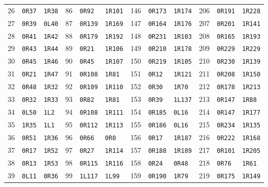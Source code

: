 \begin{tabular}{rll@{\hspace{12pt}}rll@{\hspace{12pt}}rll@{\hspace{12pt}}rll}
26 & \texttt{0R37} & \texttt{1R38} & 86 & \texttt{0R92} & \texttt{1R101} & 146 & \texttt{0R173} & \texttt{1R174} & 206 & \texttt{0R191} & \texttt{1R228}\\
27 & \texttt{0R39} & \texttt{0L40} & 87 & \texttt{0R139} & \texttt{1R169} & 147 & \texttt{0R164} & \texttt{1R176} & 207 & \texttt{0R201} & \texttt{1R141}\\
28 & \texttt{0R41} & \texttt{1R42} & 88 & \texttt{0R179} & \texttt{1R192} & 148 & \texttt{0R231} & \texttt{1R103} & 208 & \texttt{0R165} & \texttt{1R193}\\
29 & \texttt{0R43} & \texttt{1R44} & 89 & \texttt{0R21} & \texttt{1R106} & 149 & \texttt{0R210} & \texttt{1R178} & 209 & \texttt{0R229} & \texttt{1R229}\\
30 & \texttt{0R45} & \texttt{1R46} & 90 & \texttt{0R45} & \texttt{1R107} & 150 & \texttt{0R219} & \texttt{1R105} & 210 & \texttt{0R230} & \texttt{1R139}\\
31 & \texttt{0R21} & \texttt{1R47} & 91 & \texttt{0R108} & \texttt{1R81} & 151 & \texttt{0R12} & \texttt{1R121} & 211 & \texttt{0R208} & \texttt{1R150}\\
32 & \texttt{0R48} & \texttt{1R32} & 92 & \texttt{0R109} & \texttt{1R110} & 152 & \texttt{0R30} & \texttt{1R70} & 212 & \texttt{0R178} & \texttt{1R213}\\
33 & \texttt{0R32} & \texttt{1R33} & 93 & \texttt{0R82} & \texttt{1R81} & 153 & \texttt{0R39} & \texttt{1L137} & 213 & \texttt{0R147} & \texttt{1R88}\\
34 & \texttt{0L50} & \texttt{1L2} & 94 & \texttt{0R108} & \texttt{1R111} & 154 & \texttt{0R185} & \texttt{0L16} & 214 & \texttt{0R147} & \texttt{1R177}\\
35 & \texttt{1R35} & \texttt{1L1} & 95 & \texttt{0R112} & \texttt{1R113} & 155 & \texttt{0R186} & \texttt{0L16} & 215 & \texttt{0R234} & \texttt{1R135}\\
36 & \texttt{0R51} & \texttt{1R36} & 96 & \texttt{0R66} & \texttt{0R0} & 156 & \texttt{0R17} & \texttt{1R187} & 216 & \texttt{0R222} & \texttt{1R168}\\
37 & \texttt{0R17} & \texttt{1R52} & 97 & \texttt{0R27} & \texttt{1R114} & 157 & \texttt{0R188} & \texttt{1R189} & 217 & \texttt{0R101} & \texttt{1R205}\\
38 & \texttt{0R13} & \texttt{1R53} & 98 & \texttt{0R115} & \texttt{1R116} & 158 & \texttt{0R24} & \texttt{0R48} & 218 & \texttt{0R76} & \texttt{1R61}\\
39 & \texttt{0L11} & \texttt{0R36} & 99 & \texttt{1L117} & \texttt{1L99} & 159 & \texttt{0R190} & \texttt{1R79} & 219 & \texttt{0R175} & \texttt{1R149}\\

\end{tabular}
